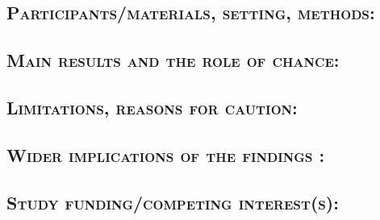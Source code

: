 \subsection*{\textsc{Participants/materials, setting, methods:}} %

\subsection*{\textsc{Main results and the role of chance:}} 

\subsection*{\textsc{Limitations, reasons for caution:}} 

\subsection*{\textsc{Wider implications of the findings :}} 

\subsection*{\textsc{Study funding/competing interest(s):}} %

